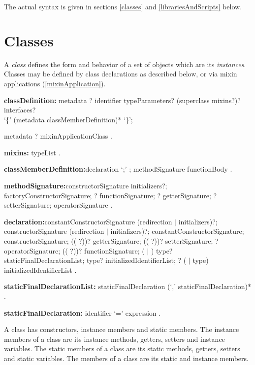 \documentclass{article}
\begin{document}
\LMHash{}
The actual syntax is given in sections \ref{classes} and \ref{librariesAndScripts} below.

\section{Classes}

\LMHash{}
A {\em class} defines the form and behavior of a set of objects which are its {\em instances}.  Classes may be defined by class declarations as described below, or via mixin applications (\ref{mixinApplication}).

\begin{grammar}
{\bf classDefinition:}
metadata \ABSTRACT{}?  \CLASS{} identifier typeParameters? (superclass mixins?)? interfaces? \\
       `\{' (metadata classMemberDefinition)* `\}';
       
metadata \ABSTRACT{}?  \CLASS{} mixinApplicationClass
    .
    
{\bf mixins:}
  \WITH{} typeList
  .

{\bf classMemberDefinition:}declaration `{\escapegrammar ;}' ;
       methodSignature functionBody
    .

{\bf methodSignature:}constructorSignature initializers?;
      factoryConstructorSignature;
      \STATIC{}? functionSignature;
      \STATIC{}? getterSignature;
      \STATIC{}? setterSignature;
      operatorSignature
    .

{\bf declaration:}constantConstructorSignature (redirection $|$ initializers)?;
      constructorSignature (redirection $|$ initializers)?;
      \EXTERNAL{} constantConstructorSignature;
      \EXTERNAL{} constructorSignature;
      ((\EXTERNAL{} \STATIC{} ?))? getterSignature;
      ((\EXTERNAL{} \STATIC{}?))? setterSignature;
      \EXTERNAL{}? operatorSignature;
       ((\EXTERNAL{} \STATIC{}?))? functionSignature;
      \STATIC{} (\FINAL{} $|$ \CONST{}) type? staticFinalDeclarationList;
      \FINAL{} type? initializedIdentifierList;
      \STATIC{}? (\VAR{} $|$ type) initializedIdentifierList
    .

{\bf staticFinalDeclarationList:}
    staticFinalDeclaration (`,' staticFinalDeclaration)*
    .

{\bf staticFinalDeclaration:}
      identifier `=' expression
    .

\end{grammar}

\LMHash{}
A class has constructors,  instance members and static members. The instance members of a class are its instance methods, getters, setters and instance variables. The static members of a class are its static methods, getters, setters and static variables. The members of a class are its static and instance members.
\end{document}

